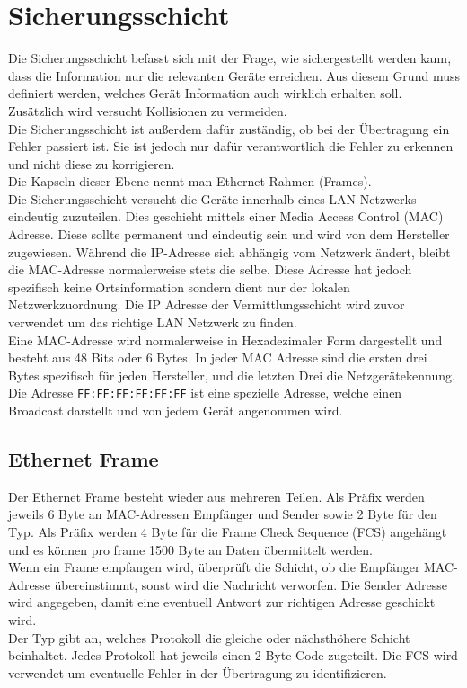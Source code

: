 \documentclass{article}
\begin{document}
	 \section{Sicherungsschicht}
	 Die Sicherungsschicht befasst sich mit der Frage, wie sichergestellt werden kann, dass die Information nur die relevanten Geräte erreichen. Aus diesem Grund muss definiert werden, welches Gerät Information auch wirklich erhalten soll. Zusätzlich wird versucht Kollisionen zu vermeiden. \\
	 Die Sicherungsschicht ist außerdem dafür zuständig, ob bei der Übertragung ein Fehler passiert ist. Sie ist jedoch nur dafür verantwortlich die Fehler zu erkennen und nicht diese zu korrigieren. \\
	 Die Kapseln dieser Ebene nennt man Ethernet Rahmen (Frames). \\
	 Die Sicherungsschicht versucht die Geräte innerhalb eines LAN-Netzwerks eindeutig zuzuteilen. Dies geschieht mittels einer Media Access Control (MAC) Adresse. Diese sollte permanent und eindeutig sein und wird von dem Hersteller zugewiesen. Während die IP-Adresse sich abhängig vom Netzwerk ändert, bleibt die MAC-Adresse normalerweise stets die selbe. Diese Adresse hat jedoch spezifisch keine Ortsinformation sondern dient nur der lokalen Netzwerkzuordnung. Die IP Adresse der Vermittlungsschicht wird zuvor verwendet um das richtige LAN Netzwerk zu finden. \\
	 Eine MAC-Adresse wird normalerweise in Hexadezimaler Form dargestellt und besteht aus 48 Bits oder 6 Bytes. In jeder MAC Adresse sind die ersten drei Bytes spezifisch für jeden Hersteller, und die letzten Drei die Netzgerätekennung. Die Adresse \verb|FF:FF:FF:FF:FF:FF| ist eine spezielle Adresse, welche einen Broadcast darstellt und von jedem Gerät angenommen wird. \\
	 \subsection{Ethernet Frame}
	 Der Ethernet Frame besteht wieder aus mehreren Teilen. Als Präfix werden jeweils 6 Byte an MAC-Adressen Empfänger und Sender sowie 2 Byte für den Typ. Als Präfix werden 4 Byte für die Frame Check Sequence (FCS) angehängt und es können pro frame 1500 Byte an Daten übermittelt werden. \\
	 Wenn ein Frame empfangen wird, überprüft die Schicht, ob die Empfänger MAC-Adresse übereinstimmt, sonst wird die Nachricht verworfen. Die Sender Adresse wird angegeben, damit eine eventuell Antwort zur richtigen Adresse geschickt wird.\\
	 Der Typ gibt an, welches Protokoll die gleiche oder nächsthöhere Schicht beinhaltet. Jedes Protokoll hat jeweils einen 2 Byte Code zugeteilt. Die FCS wird verwendet um eventuelle Fehler in der Übertragung zu identifizieren. \\
\end{document}
